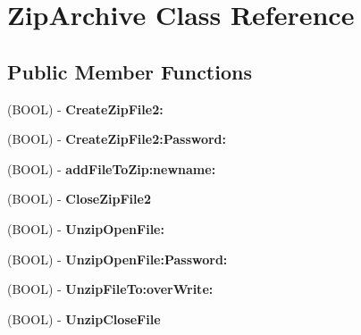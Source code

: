 \hypertarget{interface_zip_archive}{\section{Zip\-Archive Class Reference}
\label{interface_zip_archive}
}
\subsection*{Public Member Functions}
\begin{DoxyCompactItemize}
\item 
\hypertarget{interface_zip_archive_a70358b00d370617ce3102d40e6102e92}{(B\-O\-O\-L) -\/ {\bfseries Create\-Zip\-File2\-:}}\label{interface_zip_archive_a70358b00d370617ce3102d40e6102e92}

\item 
\hypertarget{interface_zip_archive_a74d2947f6a62a240c8f42f0a0dfc9233}{(B\-O\-O\-L) -\/ {\bfseries Create\-Zip\-File2\-:\-Password\-:}}\label{interface_zip_archive_a74d2947f6a62a240c8f42f0a0dfc9233}

\item 
\hypertarget{interface_zip_archive_a170c8ef05dd74baa486e1e5569f56f21}{(B\-O\-O\-L) -\/ {\bfseries add\-File\-To\-Zip\-:newname\-:}}\label{interface_zip_archive_a170c8ef05dd74baa486e1e5569f56f21}

\item 
\hypertarget{interface_zip_archive_a94f65b610c1e6b225c1df35adfa7a47b}{(B\-O\-O\-L) -\/ {\bfseries Close\-Zip\-File2}}\label{interface_zip_archive_a94f65b610c1e6b225c1df35adfa7a47b}

\item 
\hypertarget{interface_zip_archive_aa4f284add191dc8f72575e393ff27c20}{(B\-O\-O\-L) -\/ {\bfseries Unzip\-Open\-File\-:}}\label{interface_zip_archive_aa4f284add191dc8f72575e393ff27c20}

\item 
\hypertarget{interface_zip_archive_a0e1d98b7cbb21c7282009fb461a72122}{(B\-O\-O\-L) -\/ {\bfseries Unzip\-Open\-File\-:\-Password\-:}}\label{interface_zip_archive_a0e1d98b7cbb21c7282009fb461a72122}

\item 
\hypertarget{interface_zip_archive_ad79876ed74b33c3878575e223b7dcd92}{(B\-O\-O\-L) -\/ {\bfseries Unzip\-File\-To\-:over\-Write\-:}}\label{interface_zip_archive_ad79876ed74b33c3878575e223b7dcd92}

\item 
\hypertarget{interface_zip_archive_a678227669d26b01622ff61be7b68e65b}{(B\-O\-O\-L) -\/ {\bfseries Unzip\-Close\-File}}\label{interface_zip_archive_a678227669d26b01622ff61be7b68e65b}

\end{DoxyCompactItemize}
